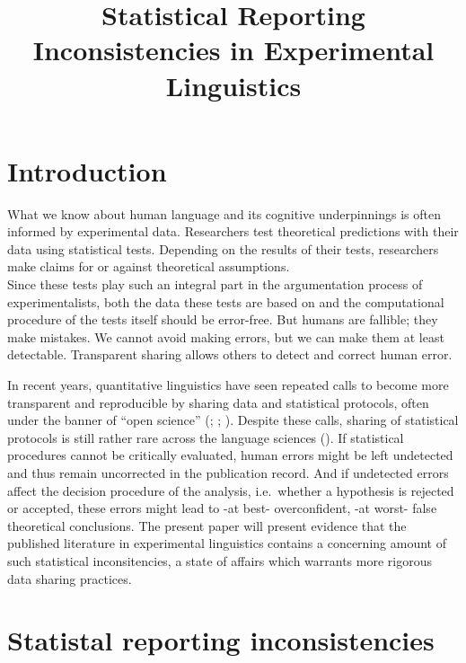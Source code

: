 \documentclass[
  doc,
  longtable,
  nolmodern,
  notxfonts,
  notimes,
  colorlinks=true,linkcolor=blue,citecolor=blue,urlcolor=blue]{apa7}
\title{Statistical Reporting Inconsistencies in Experimental
Linguistics}
\affiliation{
{anonymous}}
\begin{document}
\maketitle


\setcounter{secnumdepth}{5}

\setlength\LTleft{0pt}


\section{Introduction}\label{introduction}

What we know about human language and its cognitive underpinnings is
often informed by experimental data. Researchers test theoretical
predictions with their data using statistical tests. Depending on the
results of their tests, researchers make claims for or against
theoretical assumptions.\\
Since these tests play such an integral part in the argumentation
process of experimentalists, both the data these tests are based on and
the computational procedure of the tests itself should be error-free.
But humans are fallible; they make mistakes. We cannot avoid making
errors, but we can make them at least detectable. Transparent sharing
allows others to detect and correct human error.

In recent years, quantitative linguistics have seen repeated calls to
become more transparent and reproducible by sharing data and statistical
protocols, often under the banner of ``open science''
(;
;
). Despite these
calls, sharing of statistical protocols is still rather rare across the
language sciences (). If statistical procedures cannot be critically evaluated,
human errors might be left undetected and thus remain uncorrected in the
publication record. And if undetected errors affect the decision
procedure of the analysis, i.e.~whether a hypothesis is rejected or
accepted, these errors might lead to -at best- overconfident, -at worst-
false theoretical conclusions. The present paper will present evidence
that the published literature in experimental linguistics contains a
concerning amount of such statistical inconsitencies, a state of affairs
which warrants more rigorous data sharing practices.

\section{Statistal reporting
inconsistencies}\label{statistal-reporting-inconsistencies}
\end{document}

